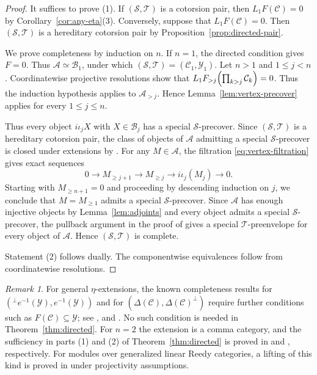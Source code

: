 \documentclass[11pt]{amsart}
\theoremstyle{definition}
\theoremstyle{remark}
\newtheorem{remark}[theorem]{Remark}
\theoremstyle{plain}
\numberwithin{equation}{section}
\begin{document}
\begin{proof}
	It suffices to prove (1). If $(\mathcal{S}, \mathcal{T})$ is a cotorsion pair, then $L_1F(\mathcal{C}) = 0$ by
	Corollary~\ref{cor:any-eta}(3). Conversely, suppose that $L_1F(\mathcal{C}) = 0$.
	Then $(\mathcal{S},\mathcal{T})$ is a hereditary cotorsion pair by
	Proposition~\ref{prop:directed-pair}.

	We prove completeness by induction on $n$.
	If $n=1$, the directed condition gives $F=0$.
	Thus $\mathcal{A}\simeq\mathcal{B}_1$, under which $(\mathcal{S},\mathcal{T})=(\mathcal{C}_1,\mathcal{Y}_1)$.
	Let $n>1$ and $1\leq j<n$.
	Coordinatewise projective resolutions show that
	$L_1F_{>j}\Bigl(\prod_{k>j}\mathcal{C}_k\Bigr)=0$. Thus the induction hypothesis applies to $\mathcal{A}_{>j}$.
	Hence Lemma~\ref{lem:vertex-precover} applies for every
	$1\leq j\leq n$.

	Thus every object $i\iota_jX$ with $X \in \mathcal{B}_j$ has a special
	$\mathcal{S}$-precover. Since $(\mathcal{S}, \mathcal{T})$ is a hereditary
	cotorsion pair, the class of objects of $\mathcal{A}$ admitting a special
	$\mathcal{S}$-precover is closed under extensions by \cite[Proposition~2.6(1)]{Hu}.
	For any $M\in\mathcal{A}$, the filtration
	\eqref{eq:vertex-filtration} gives exact sequences
	\[
	0\longrightarrow M_{\geq j+1}\longrightarrow M_{\geq j}
	\longrightarrow i\iota_j(M_j)\longrightarrow0.
	\]
	Starting with $M_{\geq n+1}=0$ and proceeding by descending induction on $j$, we conclude that $M=M_{\geq1}$ admits a special $\mathcal{S}$-precover. Since $\mathcal{A}$ has enough injective objects by Lemma~\ref{lem:adjoints} and every object admits a special $\mathcal{S}$-precover, the pullback argument in the proof of \cite[Proposition~7.1.7]{EnochsJenda}
	gives a special $\mathcal{T}$-preenvelope for every object of $\mathcal{A}$. Hence $(\mathcal{S},\mathcal{T})$ is complete.

	Statement (2) follows dually. The componentwise equivalences follow from
	coordinatewise resolutions.
\end{proof}

\begin{remark}\label{rem:hu-comparison}
For general $\eta$-extensions, the known completeness results for
$({}^\perp e^{-1}(\mathcal{Y}), e^{-1}(\mathcal{Y}))$ and for
$(\Delta(\mathcal{C}), \Delta(\mathcal{C})^\perp)$ require further conditions
such as $F(\mathcal{C}) \subseteq \mathcal{Y}$; see \cite[Theorem~3.13]{Hu},
\cite[Theorem~4.13]{LiuGao} and
\cite[Theorems~3.21 and~3.23]{ChenQinYang}. No such condition is needed in
Theorem~\ref{thm:directed}. For $n = 2$ the extension is a comma category,
and the sufficiency in parts (1) and (2) of Theorem~\ref{thm:directed} is proved in
\cite[Lemma~3.3 and Proposition~3.4]{HuZhuComma} and
\cite[Theorem~4.2 and Proposition~4.3]{YuanHeWu}, respectively.
For modules over generalized linear Reedy categories, a lifting of this
kind is proved in \cite[Theorem~9.3]{DiLiLiang} under projectivity
assumptions.
\end{remark}
\end{document}
